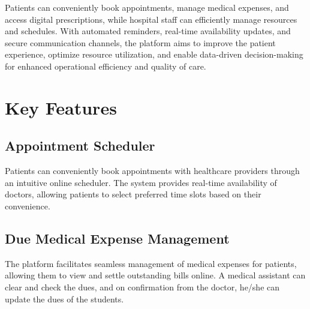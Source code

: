 \documentclass[11.5pt]{article}
\begin{document}
	Patients can conveniently book appointments, manage medical expenses, and access digital prescriptions, while hospital staff can efficiently manage resources and schedules. With automated reminders, real-time availability updates, and secure communication channels, the platform aims to improve the patient experience, optimize resource utilization, and enable data-driven decision-making for enhanced operational efficiency and quality of care.
	
	

	
	
	
	

	
	
	
	\section{Key Features}
	
	
	\subsection{Appointment Scheduler}
	
	Patients can conveniently book appointments with healthcare providers through an intuitive online scheduler. The system provides real-time availability of doctors, allowing patients to select preferred time slots based on their convenience.
	
	
	\subsection{Due Medical Expense Management}
	
	The platform facilitates seamless management of medical expenses for patients, allowing them to view and settle outstanding bills online. A medical assistant can clear and check the dues, and on confirmation from the doctor, he/she can update the dues of the students.
	
\end{document}
